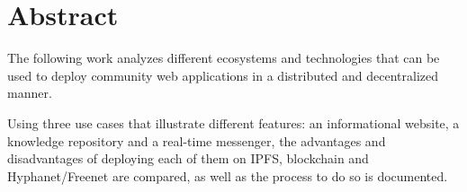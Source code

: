 \section{Abstract}

The following work analyzes different ecosystems and technologies that can be used to deploy community web applications in a distributed and decentralized manner.

Using three use cases that illustrate different features: an informational website, a knowledge repository and a real-time messenger, the advantages and disadvantages of deploying each of them on IPFS, blockchain and Hyphanet/Freenet are compared, as well as the process to do so is documented.